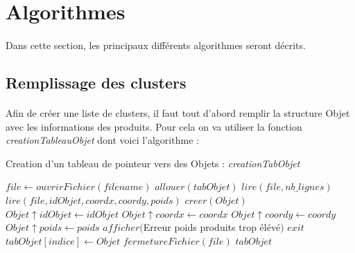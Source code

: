 \documentclass[twoside,UTF8]{EPURapport}
\begin{document}
\section{Algorithmes}

\paragraph{}
Dans cette section, les principaux différents algorithmes seront décrits.

\subsection{Remplissage des clusters}

\paragraph{}
Afin de créer une liste de clusters, il faut tout d'abord remplir la structure Objet avec les informations des produits. Pour cela on va utiliser la fonction \textit{creationTableauObjet} dont voici l'algorithme : 

\begin{algorithm}[H]
\caption{Creation d'un tableau de pointeur vers des Objets : \textit{creationTabObjet}}
\label{algo:creationTabObjet}
\begin{algorithmic}[1]

\STATE $file \leftarrow ouvrirFichier(filename)$ 
\STATE $allouer(tabObjet)$
\STATE $lire(file, nb\_lignes)$
	\STATE $lire(file, idObjet, coordx, coordy, poids)$
	\STATE $creer(Objet)$
	\STATE $Objet\uparrow idObjet \leftarrow idObjet$
	\STATE $Objet\uparrow coordx \leftarrow coordx$
	\STATE $Objet\uparrow coordy \leftarrow coordy$
	\STATE $Objet\uparrow poids \leftarrow poids$
	\STATE $afficher($Erreur poids produits trop élévé$)$
	\STATE $exit$
	\ENDIF
	\STATE $tabObjet[indice] \leftarrow Objet$
\ENDFOR
\STATE $fermetureFichier(file)$
\RETURN $tabObjet$

\end{algorithmic}
\end{algorithm}
\end{document}
